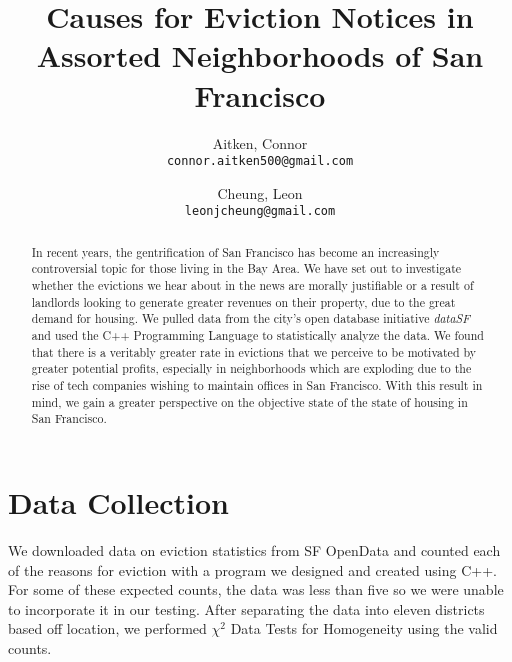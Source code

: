 \documentclass[]{article}
\title{Causes for Eviction Notices in Assorted Neighborhoods of San Francisco}
\author{
Aitken, Connor\\
\texttt{connor.aitken500@gmail.com}
\and
Cheung, Leon\\
\texttt{leonjcheung@gmail.com}
}
\begin{document}
\maketitle

\begin{abstract}
In recent years, the gentrification of San Francisco has become an increasingly controversial topic for those living in the Bay Area. We have set out to investigate whether the evictions we hear about in the news are morally justifiable or a result of landlords looking to generate greater revenues on their property, due to the great demand for housing. We pulled data from the city's open database initiative \textit{dataSF} and used the C++ Programming Language to statistically analyze the data. We found that there is a veritably greater rate in evictions that we perceive to be motivated by greater potential profits, especially in neighborhoods which are exploding due to the rise of tech companies wishing to maintain offices in San Francisco. With this result in mind, we gain a greater perspective on the objective state of the state of housing in San Francisco.
\end{abstract}

\section{Data Collection}
We downloaded data on eviction statistics from SF OpenData and counted each of the reasons for eviction with a program we designed and created using C++. For some of these expected counts, the data was less than five so we were unable to incorporate it in our testing. After separating the data into eleven districts based off location, we performed $\chi ^{2}$ Data Tests for Homogeneity using the valid counts.
\end{document}
